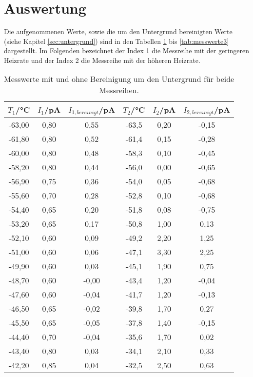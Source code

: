 \section{Auswertung}
\label{sec:Auswertung}

Die aufgenommenen Werte, sowie die um den Untergrund bereinigten Werte (siehe
Kapitel \ref{sec:untergrund}) sind in den Tabellen \ref{tab:messwerte1}
bis \ref{tab:messwerte3} dargestellt. Im Folgenden bezeichnet der Index 1 die
Messreihe mit der geringeren Heizrate und der Index 2 die Messreihe mit der
höheren Heizrate.

\begin{table}[htp]
	\begin{center}
    \caption{Messwerte mit und ohne Bereinigung um den Untergrund für beide Messreihen.}
    \label{tab:messwerte1}
		\begin{tabular}{cccccc}
		\toprule
			{$T_1$/°C} & {$I_1$/pA} & {$I_{1,bereinigt}$/pA} & {$T_2$/°C} & {$I_2$/pA} & {$I_{2,bereinigt}$/pA}\\
			\midrule
			-63,00 & 0,80 & 0,55 & -63,5 & 0,20 & -0,15\\
			-61,80 & 0,80 & 0,52 & -61,4 & 0,15 & -0,28\\
			-60,00 & 0,80 & 0,48 & -58,3 & 0,10 & -0,45\\
			-58,20 & 0,80 & 0,44 & -56,0 & 0,00 & -0,65\\
			-56,90 & 0,75 & 0,36 & -54,0 & 0,05 & -0,68\\
			-55,60 & 0,70 & 0,28 & -52,8 & 0,10 & -0,68\\
			-54,40 & 0,65 & 0,20 & -51,8 & 0,08 & -0,75\\
			-53,20 & 0,65 & 0,17 & -50,8 & 1,00 & 0,13\\
			-52,10 & 0,60 & 0,09 & -49,2 & 2,20 & 1,25\\
			-51,00 & 0,60 & 0,06 & -47,1 & 3,30 & 2,25\\
			-49,90 & 0,60 & 0,03 & -45,1 & 1,90 & 0,75\\
			-48,70 & 0,60 & -0,00 & -43,4 & 1,20 & -0,04\\
			-47,60 & 0,60 & -0,04 & -41,7 & 1,20 & -0,13\\
			-46,50 & 0,65 & -0,02 & -39,8 & 1,70 & 0,27\\
			-45,50 & 0,65 & -0,05 & -37,8 & 1,40 & -0,15\\
			-44,40 & 0,70 & -0,04 & -35,6 & 1,70 & 0,02\\
			-43,40 & 0,80 & 0,03 & -34,1 & 2,10 & 0,33\\
			-42,20 & 0,85 & 0,04 & -32,5 & 2,50 & 0,63\\

\end{tabular}
\end{center}
\end{table}
